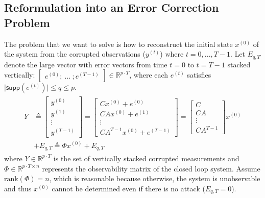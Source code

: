 \documentclass[twocolumn]{autart}    %
\begin{document}
\subsection{Reformulation into an Error Correction Problem} \label{sec:err_corr}
\vspace{-0.4cm}
The problem that we want to solve is how to reconstruct the initial state $x^{(0)}$ of the system from the corrupted observations ($y^{(t)}$) where $t=0,...,T-1$.
Let $E_{q,T}$ denote the large vector with error vectors from time $t=0$ to $t=T-1$ stacked vertically: $\begin{bmatrix} e^{(0)}; ~ ...~  ;  e^{(T-1)} \end{bmatrix}   \in  \mathbb{R}^{p\cdot T} $, where each $e^{(t)}$ satisfies $\lvert \textsf{supp}(e^{(t)}) \rvert \le q \le p $.%
\begin{eqnarray} \label{eq:sys_err_corr}
\begin{aligned}
	Y &\triangleq \begin{bmatrix} y^{(0)} \\ y^{(1)} \\ \vdots \\ y^{(T-1)} \end{bmatrix} 
		= \begin{bmatrix} Cx^{(0)} + e^{(0)} \\ CA x^{(0)} + e^{(1)} \\ \vdots \\ CA^{T-1} x^{(0)} + e^{(T-1)} \end{bmatrix} =
		\begin{bmatrix} C \\ CA \\ \vdots \\ CA^{T-1} \end{bmatrix} x^{(0)} \\&+ E_{q,T} \triangleq \Phi x^{(0)} + E_{q,T} 
\end{aligned} 
		\label{eq:decoder_Phi}
\end{eqnarray}
where $Y \in \mathbb{R}^{p\cdot T}$ is the set of vertically stacked corrupted measurements and $\Phi \in \mathbb{R}^{p\cdot T \times n}$ represents the observability matrix of the closed loop system. Assume $\text{rank}(\Phi) = n$, which is reasonable because otherwise, the system is unobservable and thus $x^{(0)}$ cannot be determined even if there is no attack ($E_{q,T} = 0$).%
\end{document}
